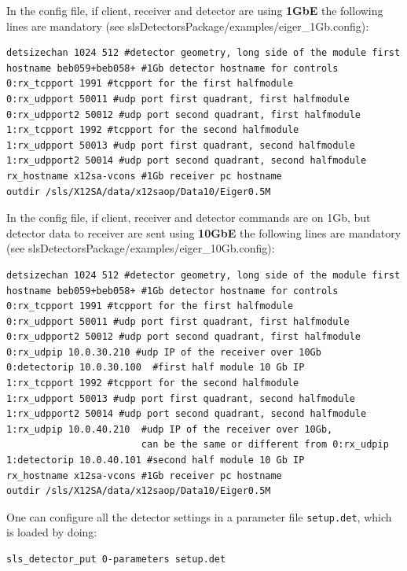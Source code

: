 \documentclass{article}
\begin{document}
In the config file, if client, receiver and detector are using \textbf{1GbE} the following lines are mandatory (see slsDetectorsPackage/examples/eiger\_1Gb.config):
\begin{verbatim}
detsizechan 1024 512 #detector geometry, long side of the module first
hostname beb059+beb058+ #1Gb detector hostname for controls
0:rx_tcpport 1991 #tcpport for the first halfmodule                 
0:rx_udpport 50011 #udp port first quadrant, first halfmodule         
0:rx_udpport2 50012 #udp port second quadrant, first halfmodule       
1:rx_tcpport 1992 #tcpport for the second halfmodule               
1:rx_udpport 50013 #udp port first quadrant, second halfmodule       
1:rx_udpport2 50014 #udp port second quadrant, second halfmodule      
rx_hostname x12sa-vcons #1Gb receiver pc hostname
outdir /sls/X12SA/data/x12saop/Data10/Eiger0.5M
\end{verbatim}

In the config file, if client, receiver and detector commands are on 1Gb, but detector data to receiver are sent using \textbf{10GbE} the following lines are mandatory (see slsDetectorsPackage/examples/eiger\_10Gb.config):
\begin{verbatim}
detsizechan 1024 512 #detector geometry, long side of the module first
hostname beb059+beb058+ #1Gb detector hostname for controls
0:rx_tcpport 1991 #tcpport for the first halfmodule                 
0:rx_udpport 50011 #udp port first quadrant, first halfmodule       
0:rx_udpport2 50012 #udp port second quadrant, first halfmodule       
0:rx_udpip 10.0.30.210 #udp IP of the receiver over 10Gb              
0:detectorip 10.0.30.100  #first half module 10 Gb IP 
1:rx_tcpport 1992 #tcpport for the second halfmodule                  
1:rx_udpport 50013 #udp port first quadrant, second halfmodule     
1:rx_udpport2 50014 #udp port second quadrant, second halfmodule  
1:rx_udpip 10.0.40.210  #udp IP of the receiver over 10Gb, 
                        can be the same or different from 0:rx_udpip                                   
1:detectorip 10.0.40.101 #second half module 10 Gb IP 
rx_hostname x12sa-vcons #1Gb receiver pc hostname
outdir /sls/X12SA/data/x12saop/Data10/Eiger0.5M
\end{verbatim}

One can configure all the detector settings in a parameter file {\tt{setup.det}}, which is loaded by doing:
\begin{verbatim}
sls_detector_put 0-parameters setup.det
\end{verbatim}
\end{document}
